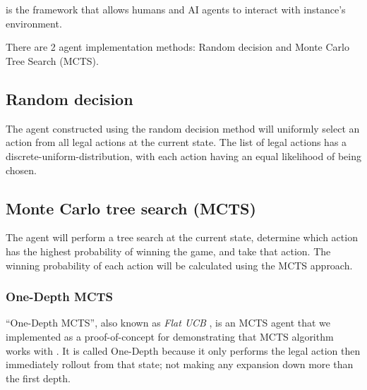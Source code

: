 \section{\RootAI}
\RootAI{} is the framework that allows humans and AI agents to interact with \RootOurs{} instance's environment.

There are 2 agent implementation methods: Random decision and Monte Carlo Tree Search (MCTS).

\subsection{Random decision}
The agent constructed using the random decision method will uniformly select an action from all legal actions at the current state. The list of legal actions has a \gls{discrete-uniform-distribution}, with each action having an equal likelihood of being chosen. %


\subsection{Monte Carlo tree search (MCTS)} %
The agent will perform a tree search at the current state, determine which action has the highest probability of winning the game, and take that action. The winning probability of each action will be calculated using the MCTS approach.


\subsubsection{One-Depth MCTS}
``One-Depth MCTS'', also known as \textit{Flat UCB} \cite{mcts-survey}, is an MCTS agent that we implemented as a proof-of-concept for demonstrating that MCTS algorithm works with \RootB{}. It is called One-Depth because it only performs the legal action then immediately rollout from that state; not making any expansion down more than the first depth.

